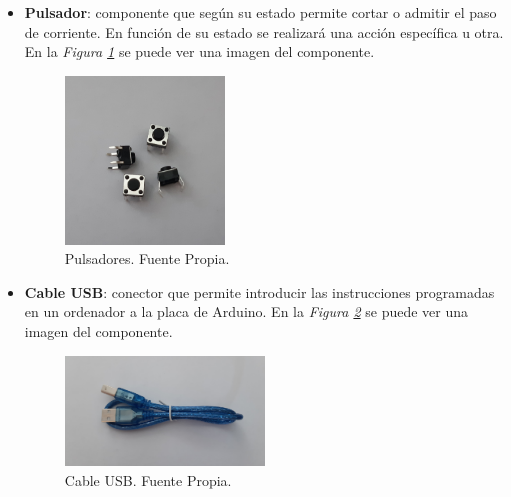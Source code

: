 \begin{itemize}
\item \textbf{Pulsador}: componente que según su estado permite cortar o admitir el paso de corriente. En función de su estado se realizará una acción específica u otra. En la \textit{Figura \ref{fig:pulsador}} se puede ver una imagen del componente.
\begin{figure}[h!]
    \centering
    \includegraphics[width=0.4\textwidth]{img/imgPulsador.JPG}
    \caption{Pulsadores. Fuente Propia.}
    \label{fig:pulsador} 
\end{figure}

\item \textbf{Cable USB}: conector que permite introducir las instrucciones programadas en un ordenador a la placa de Arduino. En la \textit{Figura \ref{fig:cableUSB}} se puede ver una imagen del componente.
\begin{figure}[h!]
    \centering
    \includegraphics[width=0.5\textwidth]{img/imgCableUSB.JPG}
    \caption{Cable USB. Fuente Propia.}
    \label{fig:cableUSB} 
\end{figure}


\end{itemize}
